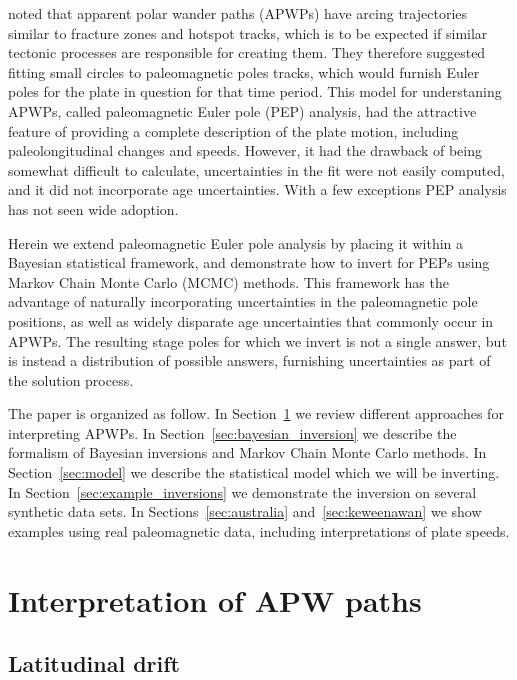 \documentclass[preprint,12pt,authoryear]{elsarticle}
\begin{document}
\citet{gordon1984paleomagnetic} noted that apparent polar wander paths (APWPs) have 
arcing trajectories similar to fracture zones and hotspot tracks, which is
to be expected if similar tectonic processes are responsible for creating them.
They therefore suggested fitting small circles to paleomagnetic poles tracks,
which would furnish Euler poles for the plate in question for that time period.
This model for understaning APWPs, called paleomagnetic Euler pole (PEP) analysis,
 had the attractive feature of providing a complete description of the plate motion, 
including paleolongitudinal changes and speeds. 
However, it had the drawback of being somewhat difficult to calculate,
uncertainties in the fit were not easily computed, and it did not incorporate
age uncertainties. With a few exceptions 
\citep{beck1989paleomagnetism, tarling1996palaeomagnetic, bryan1986rotation, beck2003absolute, smirnov2010co} 
PEP analysis has not seen wide adoption.

Herein we extend paleomagnetic Euler pole analysis by placing it within
a Bayesian statistical framework, and demonstrate how to invert for PEPs
using Markov Chain Monte Carlo (MCMC) methods. This framework has the advantage
of naturally incorporating uncertainties in the paleomagnetic pole positions,
as well as widely disparate age uncertainties that commonly occur in APWPs.
The resulting stage poles for which we invert is not a single answer, but is instead
a distribution of possible answers, furnishing uncertainties as part of the solution process.

The paper is organized as follow. In Section~\ref{sec:apwp} we review different
approaches for interpreting APWPs. In Section~\ref{sec:bayesian_inversion} we
describe the formalism of Bayesian inversions and Markov Chain Monte Carlo methods.
In Section~\ref{sec:model} we describe the statistical model which we will be inverting.
In Section~\ref{sec:example_inversions} we demonstrate the inversion on several
synthetic data sets. In Sections~\ref{sec:australia} and~\ref{sec:keweenawan}
we show examples using real paleomagnetic data, including interpretations of plate speeds.

\section{Interpretation of APW paths}
\label{sec:apwp}

\subsection{Latitudinal drift}
\end{document}
